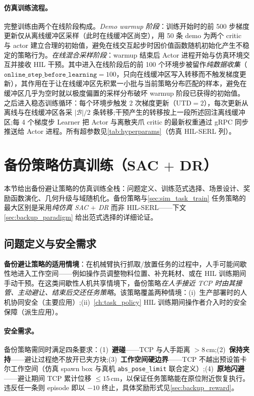 \paragraph{仿真训练流程。}完整训练由两个在线阶段构成。\emph{Demo warmup 阶段}：训练开始时的前 500 步梯度更新仅从离线缓冲区采样（此时在线缓冲区尚空），用 50 条 demo 为两个 critic 与 actor 建立合理的初始值，避免在线交互起步时因价值函数随机初始化产生不稳定的策略行为。\emph{在线混合采样阶段}：warmup 结束后 Actor 进程开始与仿真环境交互并接收 HIL 干预。其中进入在线阶段后的前 100 个环境步被留作\emph{纯数据收集}（$\texttt{online\_step\_before\_learning}=100$，只向在线缓冲区写入转移而不触发梯度更新），其作用在于让在线缓冲区先积累一小批与当前策略分布匹配的样本，避免在缓冲区几乎为空时就以极度偏置的采样分布破坏 warmup 阶段已获得的初始值。之后进入稳态训练循环：每个环境步触发 2 次梯度更新（$\text{UTD}=2$），每次更新从离线与在线缓冲区各采 $|\mathcal{B}|/2$ 条转移;干预产生的转移按上一段所述回注离线缓冲区;每 4 个梯度步 Learner 把 Actor 与离散夹爪 critic 的最新权重通过 gRPC 同步推送给 Actor 进程。所有超参数见\cref{tab:hyperparams}（仿真 HIL-SERL 列）。

\section{备份策略仿真训练（SAC $+$ DR）}\label{sec:backup_sim_train}

本节给出备份避让策略的仿真训练全栈：问题定义、训练范式选择、场景设计、奖励函数演化、几何升级与域随机化。备份策略与\cref{sec:sim_task_train} 任务策略的最大区别是采用\emph{纯仿真 SAC $+$ DR} 而非 HIL-SERL——下文 \cref{sec:backup_paradigm} 给出范式选择的详细论证。

\subsection{问题定义与安全需求}\label{sec:backup_problem}

\textbf{备份避让策略的适用情境}：在机械臂执行抓取/放置任务的过程中，人手可能间歇性地进入工作空间——例如操作员调整物料位置、补充耗材、或在 HIL 训练期间手动干预。在这类间歇性人机共享情境下，备份策略\emph{在人手接近 TCP 时由其接管、主动避让、结束后交还任务策略}。该策略覆盖两种情境：(i)~生产部署时的人机协同安全（主要应用）;(ii)~\cref{ch:task_policy} HIL 训练期间操作者介入时的安全保障（派生应用）。

\paragraph{安全需求。}备份策略需同时满足四条要求：(1)~\textbf{避碰}——TCP 与人手距离 $> 8\,\text{cm}$;(2)~\textbf{保持夹持}——避让过程绝不放开已夹方块;(3)~\textbf{工作空间硬边界}——TCP 不越出预设笛卡尔工作空间（仿真 spawn box 与真机 \texttt{abs\_pose\_limit} 联合定义）;(4)~\textbf{原地闪避}——避让期间 TCP 累计位移 $\leq 15\,\text{cm}$，以保证任务策略能在原位附近恢复执行。违反任一条则 episode 即以 $-10$ 终止，具体奖励形式见\cref{sec:backup_reward}。

